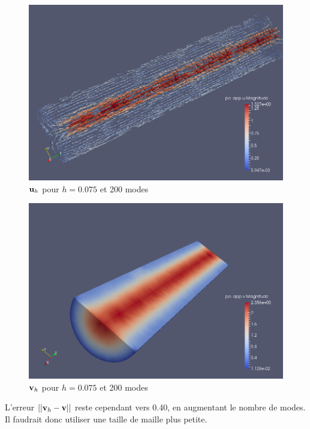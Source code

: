 \documentclass[a4paper,11pt]{article}
\begin{document}
\begin{figure}[H]
  \centering
  \includegraphics[scale=0.4]{u200}
  \caption{${\mathbf{u}}_h$ pour $h=0.075$ et 200 modes}
\end{figure}
\begin{figure}[H]
  \centering
  \includegraphics[scale=0.4]{v200}
  \caption{${\mathbf{v}}_h$ pour $h=0.075$ et 200 modes}
\end{figure}

L'erreur $||{\mathbf{v}}_h - {\mathbf{v}}||$ reste cependant vers 0.40, en augmentant le nombre de modes. Il faudrait donc utiliser une taille de maille plus petite.\\
\end{document}
